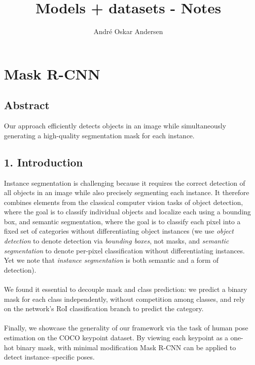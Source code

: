 \documentclass[a4paper]{report}
\title{Models + datasets - Notes}
\author{André Oskar Andersen}
\date{}
\begin{document}
    
\maketitle

\chapter*{Mask R-CNN}
\section*{Abstract}
Our approach efficiently detects objects in an image while simultaneously generating a high-quality segmentation mask for each instance. 

\section*{1. Introduction}
Instance segmentation is challenging because it requires the correct detection of all objects in an image while also precisely segmenting each instance. It therefore combines elements from the classical computer vision tasks of object detection, where the goal is to classify individual objects and localize each using a bounding box, and semantic segmentation, where the goal is to classify each pixel into a fixed set of categories without differentiating object instances (we use \textit{object detection} to denote detection via \textit{bounding boxes}, not masks, and \textit{semantic segmentation} to denote per-pixel classification without differentiating instances. Yet we note that \textit{instance segmentation} is both semantic and a form of detection).
\\
\\
We found it essential to decouple mask and class prediction: we predict a binary mask for each class independently, without competition among classes, and rely on the network's RoI classification branch to predict the category.
\\
\\
Finally, we showcase the generality of our framework via the task of human pose estimation on the COCO keypoint dataset. By viewing each keypoint as a one-hot binary mask, with minimal modification Mask R-CNN can be applied to detect instance--specific poses.
\end{document}
